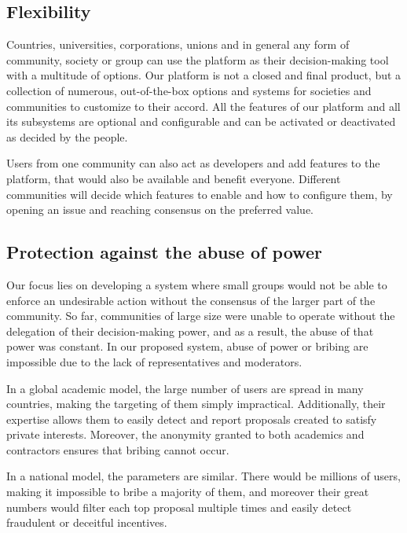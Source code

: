 \documentclass[a4paper,11pt]{article}
\begin{document}
\begin{multicols}{2}
\subsection{Flexibility} \label{flexibility}

Countries, universities, corporations, unions and in general any form of community, society or group can use the platform as their decision-making tool with a multitude of options. Our platform is not a closed and final product, but a collection of numerous, out-of-the-box options and systems for societies and communities to customize to their accord. All the features of our platform and all its subsystems are optional and configurable and can be activated or deactivated as decided by the people.

Users from one community can also act as developers and add features to the platform, that would also be available and benefit everyone. Different communities will decide which features to enable and how to configure them, by opening an issue and reaching consensus on the preferred value.

\begin{figure}[hb]
\centering
\resizebox{45mm}{!}{}
\label{TDFlogo}
\end{figure}

\subsection{Protection against the abuse of power} \label{abuse}

Our focus lies on developing a system where small groups would not be able to enforce an undesirable action without the consensus of the larger part of the community. So far, communities of large size were unable to operate without the delegation of their decision-making power, and as a result, the abuse of that power was constant. In our proposed system, abuse of power or bribing are impossible due to the lack of representatives and moderators.

In a global academic model, the large number of users are spread in many countries, making the targeting of them simply impractical. Additionally, their expertise allows them to easily detect and report proposals created to satisfy private interests. Moreover, the anonymity granted to both academics and contractors ensures that bribing cannot occur.

In a national model, the parameters are similar. There would be millions of users, making it impossible to bribe a majority of them, and moreover their great numbers would filter each top proposal multiple times and easily detect fraudulent or deceitful incentives.


\end{multicols}
\end{document}
